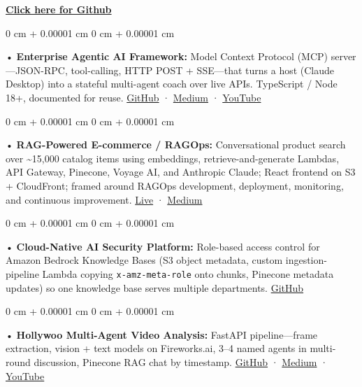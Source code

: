 \documentclass[10pt, letterpaper]{article}
\newenvironment{onecolentry}{
    \begin{adjustwidth}{
        0 cm + 0.00001 cm
    }{
        0 cm + 0.00001 cm
    }
}{
    \end{adjustwidth}
} %
\begin{document}
\textbf{\href{https://github.com/daedalus-s}{Click here for Github}}
\begin{onecolentry}
     • \textbf{Enterprise Agentic AI Framework:} Model Context Protocol (MCP) server---JSON-RPC, tool-calling, HTTP POST + SSE---that turns a host (Claude Desktop) into a stateful multi-agent coach over live APIs. TypeScript / Node 18+, documented for reuse. \href{https://github.com/daedalus-s/dota2-mcp-server}{GitHub} · \href{https://medium.com/@sreenikethaathreya/get-good-at-using-ai-noob-5d2576203112}{Medium} · \href{https://www.youtube.com/watch?v=op2gTYyFb5U}{YouTube}
\end{onecolentry}
\begin{onecolentry}
     • \textbf{RAG-Powered E-commerce / RAGOps:} Conversational product search over \textasciitilde 15,000 catalog items using embeddings, retrieve-and-generate Lambdas, API Gateway, Pinecone, Voyage AI, and Anthropic Claude; React frontend on S3 + CloudFront; framed around RAGOps development, deployment, monitoring, and continuous improvement. \href{https://prorecsa.co}{Live} · \href{https://medium.com/@sreenikethaathreya/from-rags-to-riches-bba8a671d5e6}{Medium}
\end{onecolentry}
\begin{onecolentry}
     • \textbf{Cloud-Native AI Security Platform:} Role-based access control for Amazon Bedrock Knowledge Bases (S3 object metadata, custom ingestion-pipeline Lambda copying \texttt{x-amz-meta-role} onto chunks, Pinecone metadata updates) so one knowledge base serves multiple departments. \href{https://github.com/daedalus-s/bedrock-acl-metadata}{GitHub}
\end{onecolentry}
\begin{onecolentry}
     • \textbf{Hollywoo Multi-Agent Video Analysis:} FastAPI pipeline---frame extraction, vision + text models on Fireworks.ai, 3--4 named agents in multi-round discussion, Pinecone RAG chat by timestamp. \href{https://github.com/daedalus-s/fireworks-video-discussion}{GitHub} · \href{https://medium.com/@sreenikethaathreya/hollywoo-ai-video-analysis-5eae37ca7e16}{Medium} · \href{https://www.youtube.com/watch?v=KBs_3V0OAgU}{YouTube}
\end{onecolentry}
\vspace{2 pt }
        \vspace{2 pt }
\end{document}
